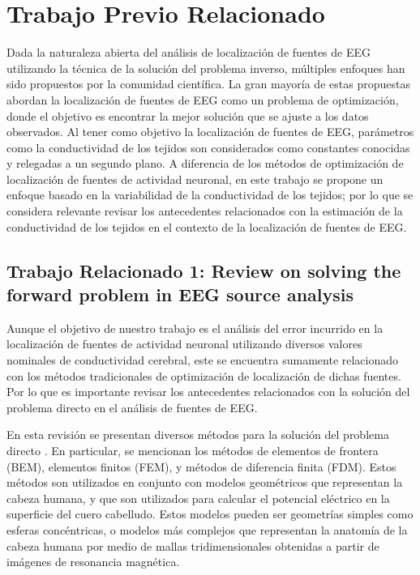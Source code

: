 %
\chapter{Trabajo Previo Relacionado}
\label{sec:related}

Dada la naturaleza abierta del análisis de localización de fuentes de EEG utilizando la técnica de la solución del problema inverso, múltiples enfoques han sido propuestos por la comunidad científica.
La gran mayoría de estas propuestas abordan la localización de fuentes de EEG como un problema de optimización, donde el objetivo es encontrar la mejor solución que se ajuste a los datos observados.
Al tener como objetivo la localización de fuentes de EEG, parámetros como la conductividad de los tejidos son considerados como constantes conocidas y relegadas a un segundo plano.
A diferencia de los métodos de optimización de localización de fuentes de actividad neuronal, en este trabajo se propone un enfoque basado en la variabilidad de la conductividad de los tejidos; por lo que se considera relevante revisar los antecedentes relacionados con la estimación de la conductividad de los tejidos en el contexto de la localización de fuentes de EEG.

\section{Trabajo Relacionado 1: Review on solving the forward problem in EEG source analysis}
\label{sec:related:hallez}

Aunque el objetivo de nuestro trabajo es el análisis del error incurrido en la localización de fuentes de actividad neuronal utilizando diversos valores nominales de conductividad cerebral, este se encuentra sumamente relacionado con los métodos tradicionales de optimización de localización de dichas fuentes.
Por lo que es importante revisar los antecedentes relacionados con la solución del problema directo en el análisis de fuentes de EEG.

En esta revisión se presentan diversos métodos para la solución del problema directo \cite{Hallez2007}. En particular, se mencionan los métodos de elementos de frontera (BEM), elementos finitos (FEM), y métodos de diferencia finita (FDM).
Estos métodos son utilizados en conjunto con modelos geométricos que representan la cabeza humana, y que son utilizados para calcular el potencial eléctrico en la superficie del cuero cabelludo.
Estos modelos pueden ser geometrías simples como esferas concéntricas, o modelos más complejos que representan la anatomía de la cabeza humana por medio de mallas tridimensionales obtenidas a partir de imágenes de resonancia magnética.

